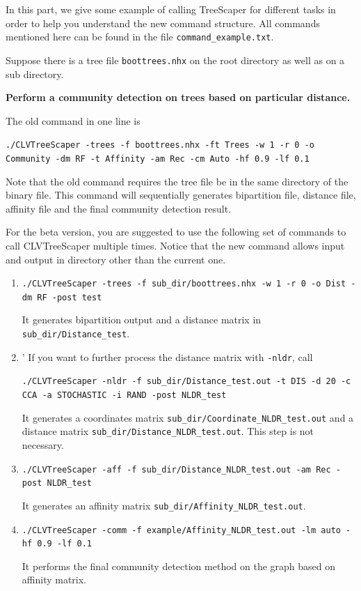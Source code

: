 \documentclass[11pt,a4paper]{article}
\theoremstyle{definition}
\theoremstyle{definition}
\numberwithin{equation}{section}
\begin{document}
	In this part, we give some example of calling TreeScaper for different tasks in order to help you understand the new command structure. All commands mentioned here can be found in the file \texttt{command\_example.txt}.
	
	Suppose there is a tree file \texttt{boottrees.nhx} on the root directory as well as on a sub directory. 
	
	\textbf{Perform a community detection on trees based on particular distance.}
	
	The old command in one line is
	
	\texttt{./CLVTreeScaper -trees -f boottrees.nhx -ft Trees -w 1 -r 0 -o Community -dm RF -t Affinity -am Rec -cm Auto -hf 0.9 -lf 0.1}
	
	Note that the old command requires the tree file be in the same directory of the binary file. This command will sequentially generates bipartition file, distance file, affinity file and the final community detection result.
	
	For the beta version, you are suggested to use the following set of commands to call CLVTreeScaper multiple times. Notice that the new command allows input and output in directory other than the current one.
	
	\begin{enumerate}
		\item \texttt{./CLVTreeScaper -trees -f sub\_dir/boottrees.nhx -w 1 -r 0 -o Dist -dm RF -post test}
		
		It generates bipartition output and a distance matrix in \texttt{sub\_dir/Distance\_test}.
		
		\item' If you want to further process the distance matrix with \texttt{-nldr}, call
		
		\texttt{./CLVTreeScaper -nldr -f sub\_dir/Distance\_test.out -t DIS -d 20 -c CCA -a STOCHASTIC -i RAND -post NLDR\_test}
		
		It generates a coordinates matrix \texttt{sub\_dir/Coordinate\_NLDR\_test.out} and a distance matrix \texttt{sub\_dir/Distance\_NLDR\_test.out}. This step is not necessary.
		
		\item \texttt{./CLVTreeScaper -aff -f sub\_dir/Distance\_NLDR\_test.out -am Rec -post NLDR\_test}
		
		It generates an affinity matrix \texttt{sub\_dir/Affinity\_NLDR\_test.out}.
		
		\item \texttt{./CLVTreeScaper -comm -f example/Affinity\_NLDR\_test.out -lm auto -hf 0.9 -lf 0.1}
		
		It performs the final community detection method on the graph based on affinity matrix. 
	\end{enumerate}
\end{document}
